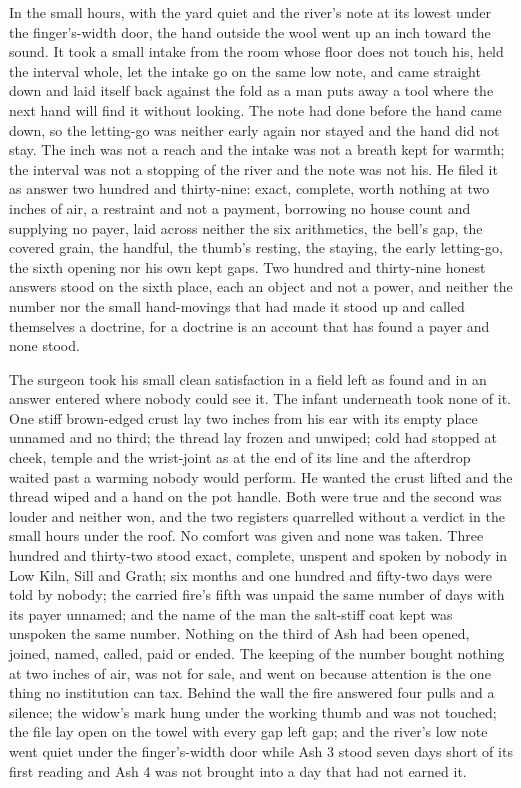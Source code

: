 In the small hours, with the yard quiet and the river's note at its lowest under the finger's-width door, the hand outside the wool went up an inch toward the sound. It took a small intake from the room whose floor does not touch his, held the interval whole, let the intake go on the same low note, and came straight down and laid itself back against the fold as a man puts away a tool where the next hand will find it without looking. The note had done before the hand came down, so the letting-go was neither early again nor stayed and the hand did not stay. The inch was not a reach and the intake was not a breath kept for warmth; the interval was not a stopping of the river and the note was not his. He filed it as answer two hundred and thirty-nine: exact, complete, worth nothing at two inches of air, a restraint and not a payment, borrowing no house count and supplying no payer, laid across neither the six arithmetics, the bell's gap, the covered grain, the handful, the thumb's resting, the staying, the early letting-go, the sixth opening nor his own kept gaps. Two hundred and thirty-nine honest answers stood on the sixth place, each an object and not a power, and neither the number nor the small hand-movings that had made it stood up and called themselves a doctrine, for a doctrine is an account that has found a payer and none stood.

The surgeon took his small clean satisfaction in a field left as found and in an answer entered where nobody could see it. The infant underneath took none of it. One stiff brown-edged crust lay two inches from his ear with its empty place unnamed and no third; the thread lay frozen and unwiped; cold had stopped at cheek, temple and the wrist-joint as at the end of its line and the afterdrop waited past a warming nobody would perform. He wanted the crust lifted and the thread wiped and a hand on the pot handle. Both were true and the second was louder and neither won, and the two registers quarrelled without a verdict in the small hours under the roof. No comfort was given and none was taken. Three hundred and thirty-two stood exact, complete, unspent and spoken by nobody in Low Kiln, Sill and Grath; six months and one hundred and fifty-two days were told by nobody; the carried fire's fifth was unpaid the same number of days with its payer unnamed; and the name of the man the salt-stiff coat kept was unspoken the same number. Nothing on the third of Ash had been opened, joined, named, called, paid or ended. The keeping of the number bought nothing at two inches of air, was not for sale, and went on because attention is the one thing no institution can tax. Behind the wall the fire answered four pulls and a silence; the widow's mark hung under the working thumb and was not touched; the file lay open on the towel with every gap left gap; and the river's low note went quiet under the finger's-width door while Ash 3 stood seven days short of its first reading and Ash 4 was not brought into a day that had not earned it.
